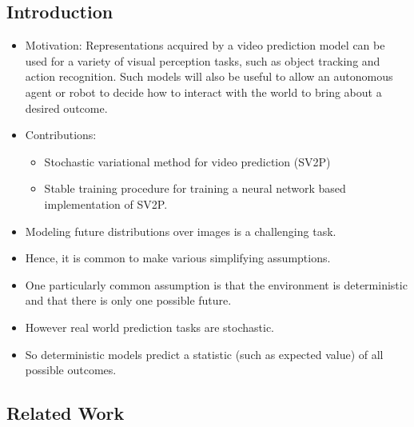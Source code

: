 \documentclass{article}
\begin{document}
    \subsection{Introduction}\label{subsec:Stochastic_Variational_Video_Prediction_(SV2P):introduction}
    \begin{itemize}
        \item Motivation: Representations acquired by a video prediction model can be used for a variety of visual perception tasks, such as object tracking and action recognition.
        Such models will also be useful to allow an autonomous agent or robot to decide how to interact with the world to bring about a desired outcome.
        \item Contributions:
        \begin{itemize}
            \item Stochastic variational method for video prediction (SV2P)
            \item Stable training procedure for training a neural network based implementation of SV2P\@.
        \end{itemize}
        \item Modeling future distributions over images is a challenging task.
        \item Hence, it is common to make various simplifying assumptions.
        \item One particularly common assumption is that the environment is deterministic and that there is only one possible future.
        \item However real world prediction tasks are stochastic.
        \item So deterministic models predict a statistic (such as expected value) of all possible outcomes.
    \end{itemize}

    \subsection{Related Work}\label{subsec:Stochastic_Variational_Video_Prediction_(SV2P):related-work}
\end{document}
